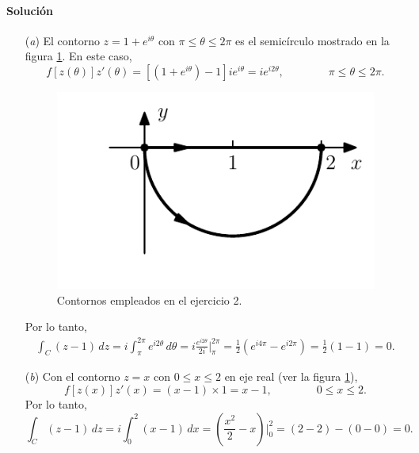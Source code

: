 \documentclass[a4paper]{report}
\begin{document}
\paragraph{Solución} 
\begin{itemize}
 \item[(\textit{a})] El contorno \(z=1+e^{i\theta}\) con \(\pi\leq\theta\leq2\pi\) es el semicírculo mostrado en la figura \ref{fig:exercise_46_02}.
En este caso, 
\[
 f[z(\theta)]z'(\theta)=\left[(1+e^{i\theta})-1\right]ie^{i\theta}=ie^{i2\theta},
 \qquad\qquad
 \pi\leq\theta\leq2\pi.
\]
 \begin{figure}[!htb]
  \begin{minipage}[c]{0.35\textwidth}
    \includegraphics[width=\textwidth]{figuras/exercise_46_02.pdf}
  \end{minipage}\hfill
  \begin{minipage}[c]{0.55\textwidth}
    \caption{
        Contornos empleados en el ejercicio 2.
    }\label{fig:exercise_46_02}
  \end{minipage}
\end{figure}
Por lo tanto,
\begin{align*}
 \int_C(z-1)\,dz=i\int_\pi^{2\pi}e^{i2\theta}\,d\theta=i\frac{e^{i2\theta}}{2i}\bigg|_\pi^{2\pi}=\frac{1}{2}(e^{i4\pi}-e^{i2\pi})=\frac{1}{2}(1-1)=0.
\end{align*}
 \item[(\textit{b})] Con el contorno \(z=x\) con \(0\leq x\leq2\) en eje real (ver la figura \ref{fig:exercise_46_02}),
 \[
  f[z(x)]z'(x)=(x-1)\times1=x-1,
  \qquad\qquad
 0\leq x\leq2.
 \]
 Por lo tanto,
 \[
  \int_C(z-1)\,dz=i\int_0^2(x-1)\,dx=\left(\frac{x^2}{2}-x\right)\bigg|_0^2=(2-2)-(0-0)=0.
 \]
\end{itemize}
\end{document}
